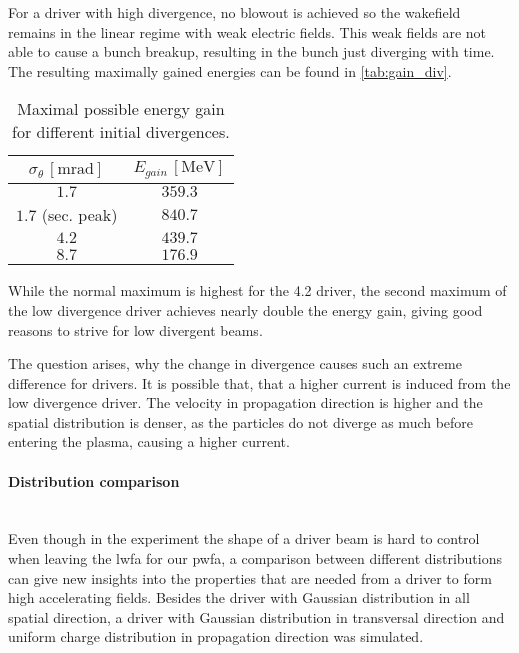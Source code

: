 \documentclass[bachelor_thesis]{subfiles}
\begin{document}
For a driver with high divergence, no blowout is achieved so the wakefield remains in the linear regime with weak electric fields. This weak fields are not able to cause a bunch breakup, resulting in the bunch just diverging with time.
The resulting maximally gained energies can be found in \autoref{tab:gain_div}.
\begin{table}[h]
\begin{center}
\begin{tabular}{|c|c|} 
	\hline
 	$\sigma_{\theta} \, \mathrm{[mrad]}$ & $E_{gain} \, \mathrm{[MeV]}$ \\ 
 	\hline
	$1.7$ & $359.3$ \\ 
	$1.7$ (sec. peak) & $840.7$ \\ 
 	$4.2$ & $439.7$ \\
	$8.7$ & $176.9$ \\
	\hline
\end{tabular}
\caption{Maximal possible energy gain for different initial divergences.}\label{tab:gain_div}
\end{center}
\end{table}
While the normal maximum is highest for the \qty{4.2}{\mrad} driver, the second maximum of the low divergence driver achieves nearly double the energy gain, giving good reasons to strive for low divergent beams.
 
The question arises, why the change in divergence causes such an extreme difference for drivers. It is possible that, that a higher current is induced from the low divergence driver. The velocity in propagation direction is higher and the spatial distribution
is denser, as the particles do not diverge as much before entering the plasma, causing a higher current. 


\paragraph*{Distribution comparison}\hspace{0pt} \\
Even though in the experiment the shape of a driver beam is hard to control when leaving the \gls{lwfa} for our \gls{pwfa}, a comparison between different distributions can give new insights into the properties that are needed from a driver
to form high accelerating fields. Besides the driver with Gaussian distribution in all spatial direction, a driver with Gaussian distribution in transversal direction and uniform charge distribution in propagation direction 
was simulated.
\end{document}
